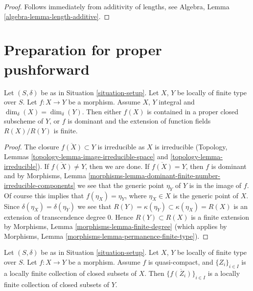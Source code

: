 \begin{proof}
Follows immediately from additivity of lengths, see
Algebra, Lemma \ref{algebra-lemma-length-additive}.
\end{proof}









\section{Preparation for proper pushforward}
\label{section-preparation-pushforward}

\begin{lemma}
\label{lemma-equal-dimension}
Let $(S, \delta)$ be as in Situation \ref{situation-setup}.
Let $X$, $Y$ be locally of finite type over $S$.
Let $f : X \to Y$ be a morphism.
Assume $X$, $Y$ integral and $\dim_\delta(X) = \dim_\delta(Y)$.
Then either $f(X)$ is contained in a proper closed subscheme
of $Y$, or $f$ is dominant and the extension of function fields
$R(X)/R(Y)$ is finite.
\end{lemma}

\begin{proof}
The closure $\overline{f(X)} \subset Y$ is irreducible as $X$
is irreducible (Topology, Lemmas
\ref{topology-lemma-image-irreducible-space} and
\ref{topology-lemma-irreducible}).
If $\overline{f(X)} \not = Y$, then we are done.
If $\overline{f(X)} = Y$, then $f$ is dominant and by
Morphisms,
Lemma \ref{morphisms-lemma-dominant-finite-number-irreducible-components}
we see that the generic point $\eta_Y$ of $Y$ is in the image of $f$.
Of course this implies that $f(\eta_X) = \eta_Y$, where $\eta_X \in X$
is the generic point of $X$. Since $\delta(\eta_X) = \delta(\eta_Y)$
we see that $R(Y) = \kappa(\eta_Y) \subset \kappa(\eta_X) = R(X)$
is an extension of transcendence degree $0$.
Hence $R(Y) \subset R(X)$ is a finite extension by
Morphisms, Lemma \ref{morphisms-lemma-finite-degree}
(which applies by
Morphisms, Lemma \ref{morphisms-lemma-permanence-finite-type}).
\end{proof}

\begin{lemma}
\label{lemma-quasi-compact-locally-finite}
Let $(S, \delta)$ be as in Situation \ref{situation-setup}.
Let $X$, $Y$ be locally of finite type over $S$.
Let $f : X \to Y$ be a morphism.
Assume $f$ is quasi-compact, and $\{Z_i\}_{i \in I}$ is a locally
finite collection of closed subsets of $X$.
Then $\{\overline{f(Z_i)}\}_{i \in I}$ is a locally finite
collection of closed subsets of $Y$.
\end{lemma}

